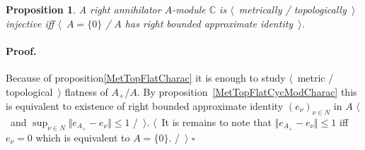 \documentclass[12pt]{article}
\newtheorem{proposition}[theorem]{Proposition}
\renewenvironment{proof}{\paragraph{Proof.}}{\hfill$\square$\medskip}
\begin{document}
\begin{proposition}\label{MetTopInjModCCharac} A right annihilator $A$-module
    $\mathbb{C}$ is $\langle$~metrically / topologically~$\rangle$ injective iff
    $\langle$~$A=\{0\}$ / $A$ has right bounded approximate identity~$\rangle$.
\end{proposition}
\begin{proof} Because of proposition\ref{MetTopFlatCharac} it is enough to study
    $\langle$~metric / topological~$\rangle$ flatness of $A_+/A$. By
    proposition~\ref{MetTopFlatCycModCharac} this is equivalent to existence of
    right bounded approximate identity ${(e_\nu)}_{\nu\in N}$ in $A$
    $\langle$~and $\sup_{\nu\in N}\Vert e_{A_+}-e_\nu\Vert\leq 1$ /~$\rangle$.
    $\langle$~It is remains to note that $\Vert e_{A_+}-e_\nu\Vert\leq 1$ iff
    $e_\nu=0$ which is equivalent to $A=\{0\}$. /~$\rangle$
\end{proof}
\end{document}
